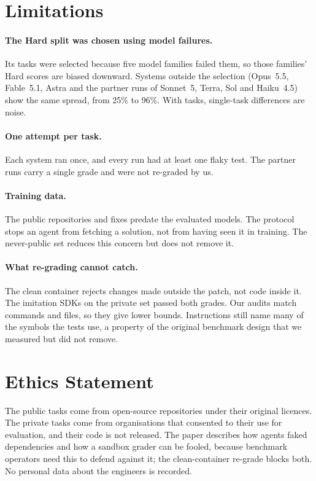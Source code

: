 \section*{Limitations}
\label{sec:limitations}
\paragraph{The Hard split was chosen using model failures.} Its tasks were selected because five model families failed them, so those families' Hard scores are biased downward. Systems outside the selection (Opus~5.5, Fable~5.1, Astra and the partner runs of Sonnet~5, Terra, Sol and Haiku~4.5) show the same spread, from 25\% to 96\%. With \nHard{} tasks, single-task differences are noise.

\paragraph{One attempt per task.} Each system ran once, and every run had at least one flaky test. The partner runs carry a single grade and were not re-graded by us.

\paragraph{Training data.} The public repositories and fixes predate the evaluated models. The protocol stops an agent from fetching a solution, not from having seen it in training. The never-public set reduces this concern but does not remove it.

\paragraph{What re-grading cannot catch.} The clean container rejects changes made outside the patch, not code inside it. The imitation SDKs on the private set passed both grades. Our audits match commands and files, so they give lower bounds. Instructions still name many of the symbols the tests use, a property of the original benchmark design that we measured but did not remove.

\section*{Ethics Statement}
The public tasks come from open-source repositories under their original licences. The private tasks come from organisations that consented to their use for evaluation, and their code is not released. The paper describes how agents faked dependencies and how a sandbox grader can be fooled, because benchmark operators need this to defend against it; the clean-container re-grade blocks both. No personal data about the engineers is recorded.
